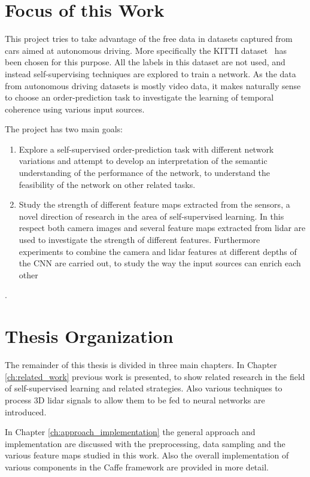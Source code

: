 \section{Focus of this Work}
This project tries to take advantage of the free data in datasets captured from cars aimed at autonomous driving. More specifically the KITTI dataset~\cite{geiger2012} has been chosen for this purpose. All the labels in this dataset are not used, and instead self-supervising techniques are explored to train a network. As the data from autonomous driving datasets is mostly video data, it makes naturally sense to choose an order-prediction task to investigate the learning of temporal coherence using various input sources.

The project has two main goals:
\begin{enumerate}
\item Explore a self-supervised order-prediction task with different network variations and attempt to develop an interpretation of the semantic understanding of the performance of the network, to understand the feasibility of the network on other related tasks.
\item Study the strength of different feature maps extracted from the sensors, a novel direction of research in the area of self-supervised learning. In this respect both camera images and several feature maps extracted from lidar are used to investigate the strength of different features. Furthermore experiments to combine the camera and lidar features at different depths of the CNN are carried out, to study the way the input sources can enrich each other
\end{enumerate}.

\section{Thesis Organization}
The remainder of this thesis is divided in three main chapters. In Chapter \ref{ch:related_work} previous work is presented, to show related research in the field of self-supervised learning and related strategies. Also various techniques to process 3D lidar signals to allow them to be fed to neural networks are introduced. 

In Chapter \ref{ch:approach_implementation} the general approach and implementation are discussed with the preprocessing, data sampling and the various feature maps studied in this work. Also the overall implementation of various components in the Caffe framework are provided in more detail. 

